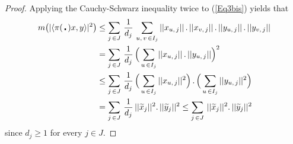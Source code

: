 \documentclass[11pt,english,a4paper]{smfart}
\numberwithin{equation}{section}
\theoremstyle{definition}
\begin{document}
\begin{proof}
 Applying the Cauchy-Schwarz inequality twice to (\ref{Eq3bis}) yields that
 \begin{align*}
m\bigl(|{\ensuremath{{\langle {\pi (\,\centerdot\,)x},{y}\rangle}}}|^{2} 
\bigr)&\le  \sum_{j\,\in J}\,\dfrac{1}{{d_{j}}}\,
\sum_{{{u,\,v}}\,\in 
I_{j}} ||x_{u,\,j}||\,.\,||x_{v,\,j}||\,.\,||y_{u,\,j}||\,.\,||y_{v,\,j}||\\
&=\sum_{j\,\in J}\,\dfrac{1}{{d_{j}}}\,\Bigl(\,\sum_{u\,\in I_{j}}||x_{u,\,j}||\,.\, 
||y_{u,\,j}||\Bigr) ^{2}\\
&\le \sum_{j\,\in J}\,\dfrac{1}{{d_{j}}}\,\Bigl(\,\sum_{u\,\in I_{j}} ||x_{u,\,j}||^{2}\Bigr)\,.\,
\Bigl(\,\sum_{u\,\in I_{j}} ||y_{u,\,j}||^{2}\Bigr)\\
&=\sum_{j\,\in J}\,\dfrac{1}{{d_{j}}}\,||{\widetilde{{x}}}_{j}||^{2}.\,||{\widetilde{{y}}}_{j}||^{2}
\le\sum_{j\,\in J}\,||{\widetilde{{x}}}_{j}||^{2}.\,||{\widetilde{{y}}}_{j}||^{2}
 \end{align*}
 since $d_{j}\ge 1$ for every $j\in J$.
\end{proof}
\end{document}
